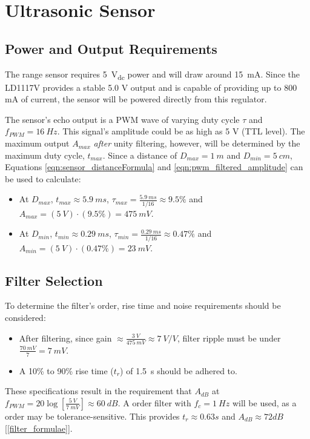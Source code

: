 \graphicspath{{content/2_design/figures/}}
\section{Ultrasonic Sensor}
\subsection{Power and Output Requirements}
The range sensor requires \SI{5}{V_{dc}} power and will draw around \SI{15}{mA}. Since the LD1117V provides a stable 5.0 V output and is capable
of providing up to 800 mA of current, the sensor will be powered directly from this regulator.

The sensor's echo output is a PWM wave of varying duty cycle $\tau$ and $f_{PWM} = \SI{16}{Hz}$.
This signal's amplitude could be as high as 5 V (TTL level). The maximum output $A_{max}$ \textit{after} unity filtering,
however, will be determined by the maximum duty cycle, $t_{max}$. Since a distance of $D_{max} = \SI{1}{m}$ and $D_{min} = \SI{5}{cm}$,
Equations \ref{eqn:sensor_distanceFormula} and \ref{eqn:pwm_filtered_amplitude} can be used to calculate:
\begin{itemize}
  \item At $D_{max}$, $t_{max} \approx \SI{5.9}{ms}$, $\tau_{max} = \frac{\SI{5.9}{ms}}{1/16} \approx 9.5 \%$ and $A_{max} = (\SI{5}{V}) \cdot (9.5 \%) = \SI{475}{mV} $.
  \item At $D_{min}$, $t_{min} \approx \SI{0.29}{ms}$, $\tau_{min} = \frac{\SI{0.29}{ms}}{1/16} \approx 0.47 \%$ and $A_{min} = (\SI{5}{V}) \cdot (0.47 \%) = \SI{23}{mV} $.
\end{itemize}

\subsection{Filter Selection}{\label{rangeSensor_filterSelection}}

To determine the filter's order, rise time and noise requirements should be considered:
\begin{itemize}
  \item After filtering, since gain $\approx \frac{\SI{3}{V}}{\SI{475}{mV}} \approx \SI{7}{V/V}$, filter ripple must be under $ \frac{\SI{70}{mV}}{7} = \SI{7}{mV}$.
  \item A 10\% to 90\% rise time ($t_r$) of \SI{1.5}{s} should be adhered to.
\end{itemize}

\noindent These specifications result in the requirement that $A_{dB}$ at $f_{PWM} = 20 \log \left[ \frac{\SI{5}{V}}{\SI{7}{mV}} \right] \approx \SI{60}{dB}$.
A  order filter with $f_c = \SI{1}{Hz}$ will be used, as a  order may be tolerance-sensitive.
This provides $t_r \approx 0.63 s$ and $A_{dB} \approx 72 dB $ [\ref{filter_formulae}].

